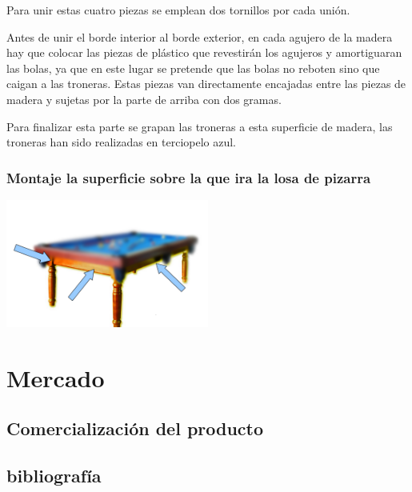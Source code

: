 Para unir estas cuatro piezas se emplean dos tornillos por cada unión.
 
Antes de unir el borde interior al borde exterior, en cada agujero de la madera hay que colocar las piezas de plástico que revestirán los agujeros y amortiguaran las bolas, ya que en este 
lugar se pretende que las bolas no reboten sino que caigan a las troneras.  Estas piezas van directamente encajadas entre las piezas de madera y sujetas por la parte de arriba con dos gramas.  

Para finalizar esta parte se grapan las troneras a esta superficie de madera, las troneras han sido realizadas en terciopelo azul.


\subsubsection {Montaje la superficie sobre la que ira la losa de pizarra}

\begin{center}
    		\includegraphics[width=0.5\textwidth]{billar2.png}
	\end{center}
\section {Mercado}

	\subsection {Comercialización del producto}


\subsection{bibliografía}




